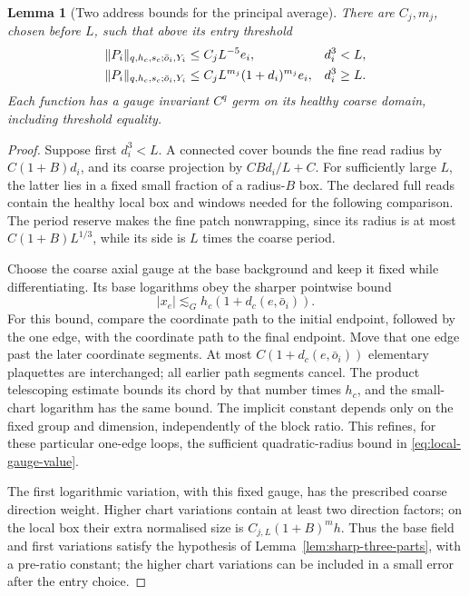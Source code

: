 \documentclass[11pt,reqno]{amsart}
\numberwithin{equation}{section}
\newtheorem{lemma}[theorem]{Lemma}
\theoremstyle{definition}
\theoremstyle{remark}
\begin{document}
\begin{lemma}[Two address bounds for the principal average]
\label{lem:sharp-principal-two-cases}
There are \(C_j,m_j\), chosen before \(L\), such that above
its entry threshold
\begin{align}
 \|P_i\|_{q,h_c,s_c;\bar o_i,Y_i}
                      &\le C_jL^{-5}e_i,&&d_i^3<L,\notag\\
 \|P_i\|_{q,h_c,s_c;\bar o_i,Y_i}
                      &\le C_jL^{m_j}(1+d_i)^{m_j}e_i,
                                                     &&d_i^3\ge L.
 \label{eq:sharp-principal-two-cases}
\end{align}
Each function has a gauge invariant \(C^q\) germ on its
healthy coarse domain, including threshold equality.
\end{lemma}
\begin{proof}
Suppose first \(d_i^3<L\). A connected cover bounds the
fine read radius by \(C(1+B)d_i\), and its coarse projection
by \(CBd_i/L+C\). For sufficiently large \(L\), the latter
lies in a fixed small fraction of a radius-\(B\) box. The
declared full reads contain the healthy local box and
windows needed for the following comparison. The period
reserve makes the fine patch nonwrapping, since its radius
is at most \(C(1+B)L^{1/3}\), while its side is \(L\)
times the coarse period.

Choose the coarse axial gauge at the base background and
keep it fixed while differentiating. Its base logarithms
obey the sharper pointwise bound
\begin{equation}
                   |x_e|\lesssim_G h_c(1+d_c(e,\bar o_i)).
 \label{eq:sharp-pointwise-axial-bound}
\end{equation}
For this bound, compare the coordinate path to the initial
endpoint, followed by the one edge, with the coordinate
path to the final endpoint. Move that one edge past the
later coordinate segments. At most \(C(1+d_c(e,\bar o_i))\)
elementary plaquettes are interchanged; all earlier path
segments cancel. The product telescoping estimate bounds
its chord by that number times \(h_c\), and the small-chart
logarithm has the same bound. The implicit constant depends
only on the fixed group and dimension, independently of
the block ratio. This refines, for these
particular one-edge loops, the sufficient quadratic-radius
bound in \eqref{eq:local-gauge-value}.

The first logarithmic variation, with this fixed gauge,
has the prescribed coarse direction weight. Higher chart
variations contain at least two direction factors; on the
local box their extra normalised size is
\(C_{j,L}(1+B)^m h\). Thus the base field and first
variations satisfy the hypothesis of
Lemma~\ref{lem:sharp-three-parts}, with a pre-ratio constant;
the higher chart variations can be included in a small
error after the entry choice.


\end{proof}
\end{document}
